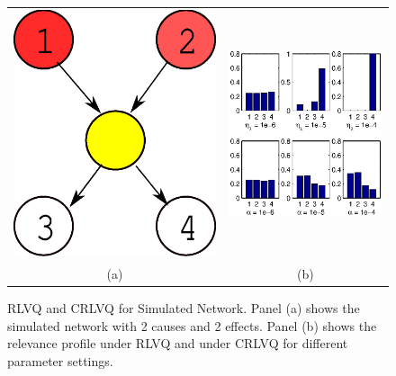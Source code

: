 \documentclass{esannV2}
\begin{document}
\begin{figure}[!h]
\begin{tabular}{cc}
\includegraphics[scale=0.2]{simnetwork.eps} & 
\includegraphics[width=.6\textwidth, height=.5\textwidth]{simlambda.eps} \\
(a) &  (b)  
\end{tabular}
\label{fig:simnetwork}
\caption{RLVQ and CRLVQ for Simulated Network. Panel (a) shows the simulated network with 2 causes and 2 effects. Panel (b) shows the relevance profile under RLVQ and under CRLVQ for different parameter settings.}
\end{figure}
\end{document}
